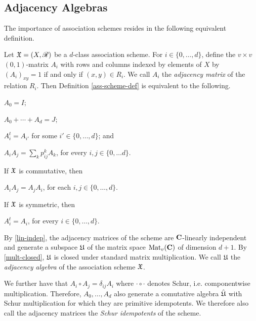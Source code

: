 \documentclass[../../../main]{subfiles}
\begin{document}
\subsection{Adjacency Algebras} 

 The importance of association schemes resides in the following equivalent definition.
 
 \begin{defin}
   Let $\mathfrak{X}=(X,\mathscr{R})$ be a $d$-class association scheme. For $i \in \{0, \dots, d\}$, define the $v \times v$ $(0,1)$-matrix $A_i$ with rows and columns indexed by elements of $X$ by $(A_i)_{xy} = 1$ if and only if $(x,y) \in R_i$. We call $A_i$ the {\it adjacency matrix} of the relation $R_i$. Then Definition \ref{ass-scheme-def} is equivalent to the following.
  \begin{defenum}
   \item\label{id-mat} $A_0=I$;
   \item\label{lin-indep} $A_0 + \cdots + A_d=J$;
   \item\label{trans-closed} $A_i^t=A_{i'}$ for some $i' \in \{0, \dots, d\}$; and
   \item\label{mult-closed} $A_iA_j=\sum_k p_{ij}^kA_k$, for every $i,j \in \{0, \dots d\}$.
  \end{defenum}
  If $\mathfrak{X}$ is commutative, then
  \begin{defenum}[resume]
   \item\label{commutative-scheme} $A_iA_j=A_jA_i$, for each $i,j \in \{0, \dots, d\}$.
  \end{defenum}
  If $\mathfrak{X}$ is symmetric, then
  \begin{defenum}[resume]
   \item\label{symmetric-scheme} $A_i^t=A_i$, for every $i \in \{0, \dots, d\}$.
  \end{defenum}

  By \ref{lin-indep}, the adjacency matrices of the scheme are $\mathbf{C}$-linearly
  independent and generate a subspace $\mathfrak{U}$ of the matrix space $\text{Mat}_v(\mathbf{C})$ of
  dimension $d+1$. 
  By \ref{mult-closed}, $\mathfrak{U}$ is closed under standard matrix multiplication. We
  call $\mathfrak{U}$ the {\it adjacency algebra} of the
  association scheme $\mathfrak{X}$. 
  
  We further have that $A_i \circ A_j = \delta_{ij}A_i$ where $\cdot\circ\cdot$
  denotes Schur, i.e. componentwise multiplication. Therefore, $A_0, \dots, 
  A_d$ also generate a comutative algebra $\hat {\mathfrak{U}}$ with Schur multiplication
  for which they are primitive idempotents. We therefore also call the adjacency matrices the {\it Schur idempotents} of the scheme.
 \end{defin}
 
\end{document}
